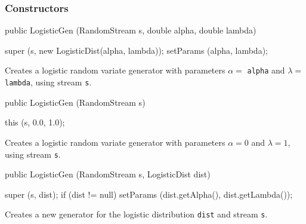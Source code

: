 \subsubsection* {Constructors}

\begin{code}

   public LogisticGen (RandomStream s, double alpha, double lambda) \begin{hide} {
      super (s, new LogisticDist(alpha, lambda));
      setParams (alpha, lambda);
   }\end{hide}
\end{code} 
\begin{tabb} Creates a logistic random variate generator with parameters
  $\alpha =$ \texttt{alpha} and $\lambda =$ \texttt{lambda},
  using stream \texttt{s}. 
\end{tabb}
\begin{code}

   public LogisticGen (RandomStream s) \begin{hide} {
      this (s, 0.0, 1.0);
   }\end{hide}
\end{code} 
\begin{tabb} Creates a logistic random variate generator with parameters
  $\alpha = 0$ and $\lambda =1$,
  using stream \texttt{s}. 
\end{tabb}
\begin{code}

   public LogisticGen (RandomStream s, LogisticDist dist) \begin{hide} {
      super (s, dist);
      if (dist != null)
         setParams (dist.getAlpha(), dist.getLambda());
   }\end{hide}
\end{code}
\begin{tabb}  Creates a new generator for the logistic distribution 
  \texttt{dist} and stream \texttt{s}.
\end{tabb}

